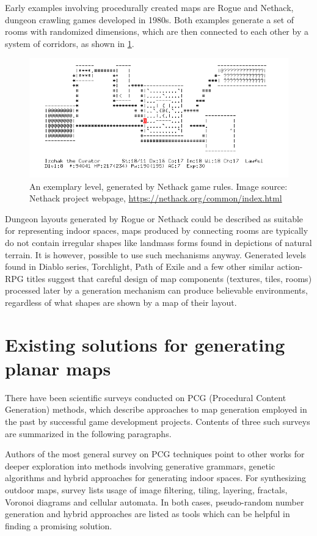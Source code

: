 \documentclass[12pt]{report}
\begin{document}
Early examples involving procedurally created maps are Rogue and Nethack, dungeon crawling games developed in 1980s. Both examples generate a set of rooms with randomized dimensions, which are then connected to each other by a system of corridors, as shown in \cref{fig:nethack}.
 

\begin{figure}[h]
	\centering
	\includegraphics[width=0.7\linewidth]{images/nethack}
	\caption{An exemplary level, generated by Nethack game rules. Image source: Nethack project webpage, \url{https://nethack.org/common/index.html}}
	\label{fig:nethack}
\end{figure}

Dungeon layouts generated by Rogue or Nethack could be described as suitable for representing indoor spaces, maps produced by connecting rooms are typically do not contain irregular shapes like landmass forms found in depictions of natural terrain. It is however, possible to use such mechanisms anyway. Generated levels found in Diablo series, Torchlight, Path of Exile and a few other similar action-RPG titles suggest that careful design of map components (textures, tiles, rooms) processed later by a generation mechanism can produce believable environments, regardless of what shapes are shown by a map of their layout. 
	

\section{Existing solutions for generating planar maps}

There have been scientific surveys conducted on PCG (Procedural Content Generation) methods, which describe approaches to map generation employed in the past by successful game development projects. Contents of three such surveys are summarized in the following paragraphs.

Authors of the most general survey on PCG techniques \autocite{hendrikx2013procedural} point to other works for deeper exploration into methods involving generative grammars, genetic algorithms and hybrid approaches for generating indoor spaces. For synthesizing outdoor maps, survey lists usage of image filtering, tiling, layering, fractals, Voronoi diagrams and cellular automata. In both cases, pseudo-random number generation and hybrid approaches are listed as tools which can be helpful in finding a promising solution. 
\end{document}
